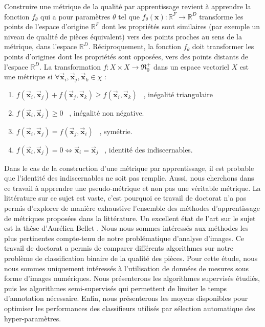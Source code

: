 Construire une métrique de la qualité par apprentissage revient à apprendre la fonction $f_{\theta}$ qui a pour paramètres $\theta$ tel que $f_{\theta}(\mathbf{x}) : \mathbb{R}^{F} \rightarrow \mathbb{R}^{D}$ transforme les points de l'espace d'origine $\mathbb{R}^{F}$ dont les propriétés sont similaires (par exemple un niveau de qualité de pièces équivalent) vers des points proches au sens de la métrique, dans l'espace $\mathbb{R}^{D}$.
Réciproquement, la fonction $f_{\theta}$ doit transformer les points d'origines dont les propriétés sont opposées, vers des points distants de l'espace $\mathbb{R}^{D}$.
La transformation $f : X \times X \rightarrow \Re_{0}^{+} $ dans un espace vectoriel $X$ est une métrique si $\forall \vec{\mathbf{x}}_{i}, \vec{\mathbf{x}}_{j}, \vec{\mathbf{x}}_{k} \in \chi$ :

\begin{enumerate}
\item $f\left(\vec{\mathbf{x}}_{i}, \vec{\mathbf{x}}_{j}\right) + f\left(\vec{\mathbf{x}}_{j}, \vec{\mathbf{x}}_{k}\right) \geq f\left(\vec{\mathbf{x}}_{i}, \vec{\mathbf{x}}_{k}\right)$ \ , inégalité triangulaire
\item $f\left(\vec{\mathbf{x}}_{i}, \vec{\mathbf{x}}_{j}\right) \geq 0$ \ , inégalité non négative.
\item $f\left(\vec{\mathbf{x}}_{i}, \vec{\mathbf{x}}_{j}\right)=f\left(\vec{\mathbf{x}}_{j}, \vec{\mathbf{x}}_{i}\right)$ \ , symétrie.
\item $f\left(\vec{\mathbf{x}}_{i}, \vec{\mathbf{x}}_{j}\right)=0 \Longleftrightarrow \vec{\mathbf{x}}_{i}=\vec{\mathbf{x}}_{j}$ \ , identité des indiscernables.
\end{enumerate}

Dans le cas de la construction d'une métrique par apprentissage, il est probable que l'identité des indiscernables ne soit pas remplie.
Aussi, nous cherchons dans ce travail à apprendre une pseudo-métrique et non pas une véritable métrique.
La littérature sur ce sujet est vaste, c'est pourquoi ce travail de doctorat n'a pas permis d'explorer de manière exhaustive l'ensemble des méthodes d'apprentissage de métriques proposées dans la littérature.
Un excellent état de l'art sur le sujet est la thèse d'Aurélien Bellet \cite{bellet_supervised_2012}.
Nous nous sommes intéressés aux méthodes les plus pertinentes compte-tenu de notre problématique d'analyse d'images.
Ce travail de doctorat a permis de comparer différents algorithmes sur notre problème de classification binaire de la qualité des pièces.
Pour cette étude, nous nous sommes uniquement intéressés à l'utilisation de données de mesures sous forme d'images numériques.
Nous présenterons les algorithmes supervisés étudiés, puis les algorithmes semi-supervisés qui permettent de limiter le temps d'annotation nécessaire.
Enfin, nous présenterons les moyens disponibles pour optimiser les performances des classifieurs utilisés par sélection automatique des hyper-paramètres.

